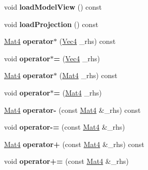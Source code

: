 \begin{DoxyCompactItemize}
\item 
\hypertarget{classMat4_ab8a59432b5fa5ee98e336ce0b6aa1535}{void {\bfseries load\-Model\-View} () const }\label{classMat4_ab8a59432b5fa5ee98e336ce0b6aa1535}

\item 
\hypertarget{classMat4_a421fdc614bb0b3e7346371aed1cf900c}{void {\bfseries load\-Projection} () const }\label{classMat4_a421fdc614bb0b3e7346371aed1cf900c}

\item 
\hypertarget{classMat4_a3f84f383608d74a9bb8c507664099fe7}{\hyperlink{classMat4}{Mat4} {\bfseries operator$\ast$} (\hyperlink{classVec4}{Vec4} \-\_\-rhs) const }\label{classMat4_a3f84f383608d74a9bb8c507664099fe7}

\item 
\hypertarget{classMat4_a7ed702b4f5f96c4c637a0a734cefccdc}{void {\bfseries operator$\ast$=} (\hyperlink{classVec4}{Vec4} \-\_\-rhs)}\label{classMat4_a7ed702b4f5f96c4c637a0a734cefccdc}

\item 
\hypertarget{classMat4_ac9933d6ea182f14d60f45d5024d0be6b}{\hyperlink{classMat4}{Mat4} {\bfseries operator$\ast$} (\hyperlink{classMat4}{Mat4} \-\_\-rhs) const }\label{classMat4_ac9933d6ea182f14d60f45d5024d0be6b}

\item 
\hypertarget{classMat4_ad1218272826f2ec7925799eab5cc7c6c}{void {\bfseries operator$\ast$=} (\hyperlink{classMat4}{Mat4} \-\_\-rhs)}\label{classMat4_ad1218272826f2ec7925799eab5cc7c6c}

\item 
\hypertarget{classMat4_a35adb205aa6f8bb79aa333d9b9d5005d}{\hyperlink{classMat4}{Mat4} {\bfseries operator-\/} (const \hyperlink{classMat4}{Mat4} \&\-\_\-rhs) const }\label{classMat4_a35adb205aa6f8bb79aa333d9b9d5005d}

\item 
\hypertarget{classMat4_ab53b1728ae532e9603c85203968aca81}{void {\bfseries operator-\/=} (const \hyperlink{classMat4}{Mat4} \&\-\_\-rhs)}\label{classMat4_ab53b1728ae532e9603c85203968aca81}

\item 
\hypertarget{classMat4_ab02e3c184978f005312c6971a4d0635f}{\hyperlink{classMat4}{Mat4} {\bfseries operator+} (const \hyperlink{classMat4}{Mat4} \&\-\_\-rhs) const }\label{classMat4_ab02e3c184978f005312c6971a4d0635f}

\item 
\hypertarget{classMat4_a9c05e2058fd5b01dbdca73ef8c518289}{void {\bfseries operator+=} (const \hyperlink{classMat4}{Mat4} \&\-\_\-rhs)}\label{classMat4_a9c05e2058fd5b01dbdca73ef8c518289}


\end{DoxyCompactItemize}
